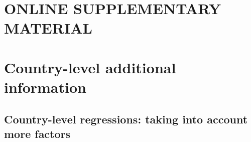 \documentclass[10pt, letterpaper]{article}
\begin{document}
\begin{spacing}{1.0}












\newpage
\section*{\huge ONLINE SUPPLEMENTARY MATERIAL}

\tableofcontents

\section{Country-level additional information}



\subsection{Country-level regressions: taking into account more factors}



\end{spacing}
\end{document}
